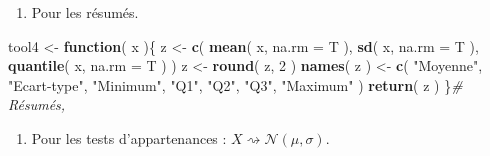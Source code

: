 \documentclass[
  11pt,
  french,
]{article}
\newenvironment{Shaded}{\begin{snugshade}}{\end{snugshade}}
\newcommand{\CommentTok}[1]{\textcolor[rgb]{0.56,0.35,0.01}{\textit{#1}}}
\newcommand{\ControlFlowTok}[1]{\textcolor[rgb]{0.13,0.29,0.53}{\textbf{#1}}}
\newcommand{\DataTypeTok}[1]{\textcolor[rgb]{0.13,0.29,0.53}{#1}}
\newcommand{\DecValTok}[1]{\textcolor[rgb]{0.00,0.00,0.81}{#1}}
\newcommand{\KeywordTok}[1]{\textcolor[rgb]{0.13,0.29,0.53}{\textbf{#1}}}
\newcommand{\NormalTok}[1]{#1}
\newcommand{\OperatorTok}[1]{\textcolor[rgb]{0.81,0.36,0.00}{\textbf{#1}}}
\newcommand{\StringTok}[1]{\textcolor[rgb]{0.31,0.60,0.02}{#1}}
\providecommand{\tightlist}{%
  \setlength{\itemsep}{0pt}\setlength{\parskip}{0pt}}
\begin{document}
\begin{enumerate}
\def\labelenumi{\arabic{enumi}.}
\setcounter{enumi}{3}
\tightlist
\item
  Pour les résumés.
\end{enumerate}

\begin{Shaded}
\begin{Highlighting}[]
\NormalTok{tool4 <-}\StringTok{ }\ControlFlowTok{function}\NormalTok{( x )\{}
\NormalTok{  z <-}\StringTok{ }\KeywordTok{c}\NormalTok{( }\KeywordTok{mean}\NormalTok{( x,}
                \DataTypeTok{na.rm =}\NormalTok{ T ),}
          \KeywordTok{sd}\NormalTok{( x,}
              \DataTypeTok{na.rm =}\NormalTok{ T ),}
          \KeywordTok{quantile}\NormalTok{( x,}
                    \DataTypeTok{na.rm =}\NormalTok{ T ) )}
\NormalTok{  z <-}\StringTok{ }\KeywordTok{round}\NormalTok{( z,}
              \DecValTok{2}\NormalTok{ )}
  \KeywordTok{names}\NormalTok{( z ) <-}\StringTok{ }\KeywordTok{c}\NormalTok{( }\StringTok{"Moyenne"}\NormalTok{,}
                   \StringTok{"Ecart-type"}\NormalTok{,}
                   \StringTok{"Minimum"}\NormalTok{,}
                   \StringTok{"Q1"}\NormalTok{,}
                   \StringTok{"Q2"}\NormalTok{,}
                   \StringTok{"Q3"}\NormalTok{,}
                   \StringTok{"Maximum"}\NormalTok{ )}
  \KeywordTok{return}\NormalTok{( z )}
\NormalTok{\}}\CommentTok{# Résumés,}
\end{Highlighting}
\end{Shaded}

\begin{enumerate}
\def\labelenumi{\arabic{enumi}.}
\setcounter{enumi}{4}
\tightlist
\item
  Pour les tests d'appartenances :
  \(X\rightsquigarrow\mathcal{N}(\mu,\sigma)\).
\end{enumerate}

\begin{Shaded}
\end{Shaded}
\end{document}
